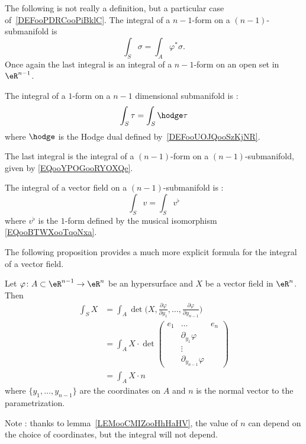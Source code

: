 The following is not really a definition, but a particular case of~\ref{DEFooPDRCooPiBklC}. The integral of a \( n-1\)-form on a \( (n-1)\)-submanifold is
\begin{equation}        \label{EQooYPOGooRYOXQe}
    \int_S\sigma=\int_A\varphi^*\sigma.
\end{equation}
Once again the last integral is an integral of a \( n-1\)-form on an open set in \( \eR^{n-1}\).

\begin{definition}       \label{DEFooAXFXooWiMLKP}
    The integral of a \( 1\)-form on a \( n-1\) dimensional submanifold is :
    \begin{equation}
        \int_S\tau=\int_S\hodge\tau
    \end{equation}
    where \( \hodge\) is the Hodge dual defined by~\ref{DEFooUOJQooSzKjNR}.
\end{definition}
The last integral is the integral of a \( (n-1)\)-form on a \( (n-1)\)-submanifold, given by \eqref{EQooYPOGooRYOXQe}.

\begin{definition}      \label{DEFooAXZGooJairMQ}
    The integral of a vector field on a \( (n-1)\)-submanifold is :
    \begin{equation}
        \int_Sv=\int_Sv^{\flat}
    \end{equation}
    where \( v^{\flat}\) is the \( 1\)-form defined by the musical isomorphism \eqref{EQooBTWXooTqoNxa}.
\end{definition}

The following proposition provides a much more explicit formula for the integral of a vector field.

\begin{proposition}     \label{PROPooETLZooAVsrwy}
    Let \( \varphi\colon A\subset \eR^{n-1}\to \eR^n\) be an hypersurface and \( X\) be a vector field in \( \eR^n\). Then
    \begin{subequations}
        \begin{align}
            \int_SX&=\int_A\det\big( X,\frac{ \partial \varphi }{ \partial y_1 },\ldots, \frac{ \partial \varphi }{ \partial y_{n-1} } \big)  \label{SUBEQooWJSPooImJjQN}\\
            &=\int_A X\cdot\det\begin{pmatrix}
                e_1    &   \ldots    &   e_n    \\
                &   \partial_{y_1}\varphi    &       \\
                &    \vdots   &       \\
                &   \partial_{y_{n-1}}\varphi    &
            \end{pmatrix}\\
            &=\int_A X\cdot n
        \end{align}
    \end{subequations}
    where \( \{ y_1,\ldots, y_{n-1} \}\) are the coordinates on \( A\) and \( n\) is the normal vector to the parametrization.
\end{proposition}
Note : thanks to lemma~\ref{LEMooCMIZooHhHaHV}, the value of \( n\) can depend on the choice of coordinates, but the integral will not depend.

